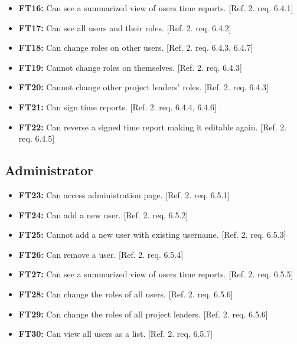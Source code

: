 \documentclass{article}
\begin{document}
			\begin{itemize}
			
			\item \textbf{FT16:} Can see a summarized view of users time reports. [Ref. 2. req. 6.4.1]
			
  			\item \textbf{FT17:} Can see all users and their roles. [Ref. 2. req. 6.4.2]

  			\item \textbf{FT18:} Can change roles on other users. [Ref. 2. req. 6.4.3, 6.4.7]
  			
  			\item \textbf{FT19:} Cannot change roles on themselves. [Ref. 2. req. 6.4.3]
  			
  			\item \textbf{FT20:} Cannot change other project leaders' roles. [Ref. 2. req. 6.4.3]
  			
  			\item \textbf{FT21:} Can sign time reports. [Ref. 2. req. 6.4.4, 6.4.6]
  			
  			\item \textbf{FT22:} Can reverse a signed time report making it editable again. [Ref. 2. req. 6.4.5]

		\end{itemize}
		
		\subsection{Administrator}
		
			\begin{itemize}
			
	
			\item \textbf{FT23:} Can access administration page. [Ref. 2. req. 6.5.1]			
			
  			\item \textbf{FT24:} Can add a new user. [Ref. 2. req. 6.5.2]
  		
  			\item \textbf{FT25:} Cannot add a new user with existing username. [Ref. 2. req. 6.5.3]

  			\item \textbf{FT26:} Can remove a user. [Ref. 2. req. 6.5.4]
  			
  			\item \textbf{FT27:} Can see a summarized view of users time reports. [Ref. 2. req. 6.5.5]  		  			
  			\item \textbf{FT28:} Can change the roles of all users. [Ref. 2. req. 6.5.6]
  			
  			\item \textbf{FT29:} Can change the roles of all project leaders. [Ref. 2. req. 6.5.6]
  			
  			\item \textbf{FT30:} Can view all users as a list. [Ref. 2. req. 6.5.7]

		\end{itemize}
		
\end{document}
